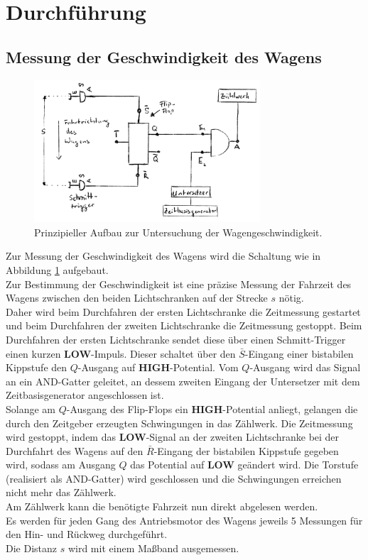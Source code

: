 \section{Durchführung}
\FloatBarrier
\label{sec:Durchführung}
\subsection{Messung der Geschwindigkeit des Wagens}
\label{sec:speedygonzales}
\begin{figure}
	\centering
	\includegraphics[width=0.75\textwidth]{Bilder/geschwindigkeit_schaltung.png}
	\caption{Prinzipieller Aufbau zur Untersuchung der Wagengeschwindigkeit.}
	\label{fig:wagen} %
\end{figure}
Zur Messung der Geschwindigkeit des Wagens wird die Schaltung wie in Abbildung \ref{fig:wagen} aufgebaut.\\
Zur Bestimmung der Geschwindigkeit ist eine präzise Messung der Fahrzeit des Wagens zwischen den beiden Lichtschranken auf der Strecke $s$ nötig.\\
Daher wird beim Durchfahren der ersten Lichtschranke die Zeitmessung gestartet und beim Durchfahren der zweiten Lichtschranke die Zeitmessung gestoppt.
Beim Durchfahren der ersten Lichtschranke sendet diese über einen Schmitt-Trigger einen kurzen \textbf{LOW}-Impuls. Dieser schaltet über den $\bar{S}$-Eingang einer bistabilen Kippstufe den $Q$-Ausgang auf \textbf{HIGH}-Potential.
Vom $Q$-Ausgang wird das Signal an ein AND-Gatter geleitet,
an dessem zweiten Eingang der Untersetzer mit dem Zeitbasisgenerator angeschlossen ist. \\
Solange am $Q$-Ausgang des Flip-Flops ein \textbf{HIGH}-Potential anliegt, gelangen die durch den Zeitgeber erzeugten Schwingungen in das Zählwerk.
Die Zeitmessung wird gestoppt, indem das \textbf{LOW}-Signal an der zweiten Lichtschranke  bei der Durchfahrt des Wagens auf den $\bar{R}$-Eingang der bistabilen Kippstufe gegeben wird,
sodass am Ausgang $Q$ das Potential auf \textbf{LOW} geändert wird. Die Torstufe (realisiert als AND-Gatter) wird geschlossen und die Schwingungen erreichen nicht mehr das Zählwerk.\\
Am Zählwerk kann die benötigte Fahrzeit nun direkt abgelesen werden.\\
Es werden für jeden Gang des Antriebsmotor des Wagens jeweils 5 Messungen für den Hin- und Rückweg durchgeführt. \\
Die Distanz $s$ wird mit einem Maßband ausgemessen.

